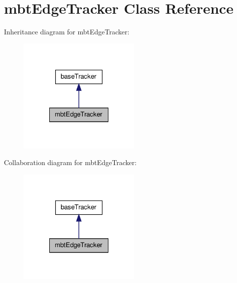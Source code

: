 \hypertarget{classmbtEdgeTracker}{\section{mbt\-Edge\-Tracker \-Class \-Reference}
\label{classmbtEdgeTracker}
}


\-Inheritance diagram for mbt\-Edge\-Tracker\-:\nopagebreak
\begin{figure}[H]
\begin{center}
\leavevmode
\includegraphics[width=168pt]{classmbtEdgeTracker__inherit__graph}
\end{center}
\end{figure}


\-Collaboration diagram for mbt\-Edge\-Tracker\-:\nopagebreak
\begin{figure}[H]
\begin{center}
\leavevmode
\includegraphics[width=168pt]{classmbtEdgeTracker__coll__graph}
\end{center}
\end{figure}
